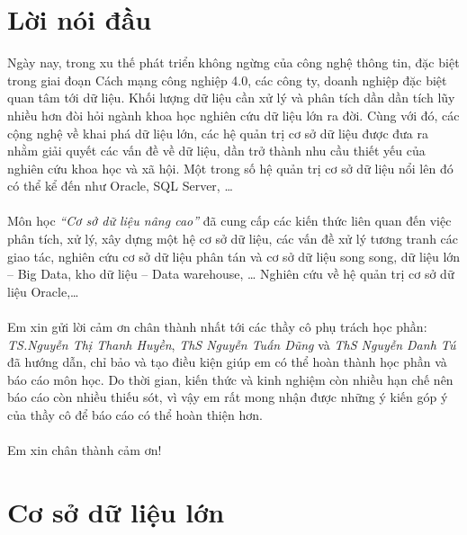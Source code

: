 \documentclass[12pt,a4paper]{report}
\begin{document}
	\chapter*{Lời nói đầu}
	Ngày nay, trong xu thế phát triển không ngừng của công nghệ thông tin, đặc biệt trong giai đoạn Cách mạng công nghiệp 4.0, các công ty, doanh nghiệp đặc biệt quan tâm tới dữ liệu. Khối lượng dữ liệu cần xử lý và phân tích dần dần tích lũy nhiều hơn đòi hỏi ngành khoa học nghiên cứu dữ liệu lớn ra đời. Cùng với đó, các cộng nghệ về khai phá dữ liệu lớn, các hệ quản trị cơ sở dữ liệu được đưa ra nhằm giải quyết các vấn đề về dữ liệu, dần trở thành nhu cầu thiết yếu của nghiên cứu khoa học và xã hội. Một trong số hệ quản trị cơ sở dữ liệu nổi lên đó có thể kể đến như Oracle, SQL Server, …\\\\
	Môn học \textit{“Cơ sở dữ liệu nâng cao”} đã cung cấp các kiến thức liên quan đến việc phân tích, xử lý, xây dựng một hệ cơ sở dữ liệu, các vấn đề xử lý tương tranh các giao tác, nghiên cứu cơ sở dữ liệu phân tán và cơ sở dữ liệu song song, dữ liệu lớn – Big Data, kho dữ liệu – Data warehouse, … Nghiên cứu về hệ quản trị cơ sở dữ liệu Oracle,…\\\\
	Em xin gửi lời cảm ơn chân thành nhất tới các thầy cô phụ trách học phần: \textit{TS.Nguyễn Thị Thanh Huyền}, \textit{ThS Nguyễn Tuấn Dũng} và \textit{ThS Nguyễn Danh Tú} đã hướng dẫn, chỉ bảo và tạo điều kiện giúp em có thể hoàn thành học phần và báo cáo môn học. Do thời gian, kiến thức và kinh nghiệm còn nhiều hạn chế nên báo cáo còn nhiều thiếu sót, vì vậy em rất mong nhận được những ý kiến góp ý của thầy cô để báo cáo có thể hoàn thiện hơn.\\\\
	Em xin chân thành cảm ơn!
	\tableofcontents
	\chapter{Cơ sở dữ liệu lớn}
\end{document}
